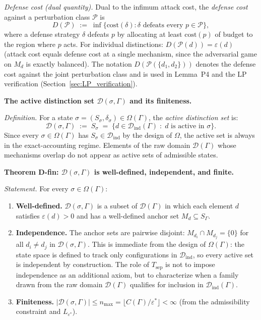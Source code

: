 \documentclass[11pt]{article}
\theoremstyle{remark}
\begin{document}
\begin{tcolorbox}[defbox, title={$\mathrm{FD4}$ (State Space and Enforcement Cost)}]
\smallskip\noindent\textit{Defense cost (dual quantity).}  Dual to the infimum attack cost, the \emph{defense cost} against a perturbation class $\mathcal{P}$ is
\[
D(\mathcal{P}) \;:=\; \inf\bigl\{\mathrm{cost}(\delta) : \delta \text{ defeats every } p \in \mathcal{P}\bigr\},
\]
where a defense strategy $\delta$ defeats $p$ by allocating at least $\mathrm{cost}(p)$ of budget to the region where $p$ acts.  For individual distinctions: $D(\mathcal{P}(d)) = \varepsilon(d)$ (attack cost equals defense cost at a single mechanism, since the adversarial game on $M_d$ is exactly balanced).  The notation $D(\mathcal{P}(\{d_1,d_2\}))$ denotes the defense cost against the joint perturbation class and is used in Lemma~P4 and the LP verification (Section~\ref{sec:LP_verification}).

\medskip
\noindent\textbf{The active distinction set $\mathcal{D}(\sigma,\Gamma)$ and its finiteness.}
\label{defn:Dsigma}

\textit{Definition.}  For a state $\sigma = (S_\sigma, \delta_\sigma) \in \Omega(\Gamma)$, the \emph{active distinction set} is:
\[
\mathcal{D}(\sigma, \Gamma) \;:=\; S_\sigma \;=\; \bigl\{d \in \mathcal{D}_{\mathrm{ind}}(\Gamma) \;:\; d \text{ is active in } \sigma\bigr\}.
\]
Since every $\sigma \in \Omega(\Gamma)$ has $S_\sigma \in \mathcal{D}_{\mathrm{ind}}$ by the design of $\Omega$, the active set is always in the exact-accounting regime.  Elements of the raw domain $\mathcal{D}(\Gamma)$ whose mechanisms overlap do not appear as active sets of admissible states.

\smallskip\noindent\textbf{Theorem D-fin: $\mathcal{D}(\sigma,\Gamma)$ is well-defined, independent, and finite.}

\textit{Statement.}  For every $\sigma \in \Omega(\Gamma)$:
\begin{enumerate}[nosep,leftmargin=2em,itemsep=2pt,label=(\alph*)]
  \item \textbf{Well-defined.}  $\mathcal{D}(\sigma,\Gamma)$ is a subset of $\mathcal{D}(\Gamma)$ in which each element $d$ satisfies $\varepsilon(d) > 0$ and has a well-defined anchor set $M_d \subseteq S_\Gamma$.
  \item \textbf{Independence.}  The anchor sets are pairwise disjoint: $M_{d_i} \cap M_{d_j} = \{0\}$ for all $d_i \ne d_j$ in $\mathcal{D}(\sigma,\Gamma)$.  This is immediate from the design of $\Omega(\Gamma)$: the state space is defined to track only configurations in $\mathcal{D}_{\mathrm{ind}}$, so every active set is independent by construction.  The role of $T_{\mathrm{sep}}$ is not to impose independence as an additional axiom, but to characterize when a family drawn from the raw domain $\mathcal{D}(\Gamma)$ qualifies for inclusion in $\mathcal{D}_{\mathrm{ind}}(\Gamma)$.
  \item \textbf{Finiteness.}  $|\mathcal{D}(\sigma,\Gamma)| \le n_{\max} = \lfloor C(\Gamma)/\varepsilon^*\rfloor < \infty$ (from the admissibility constraint and $L_{\varepsilon^*}$).
\end{enumerate}


\end{tcolorbox}
\end{document}
